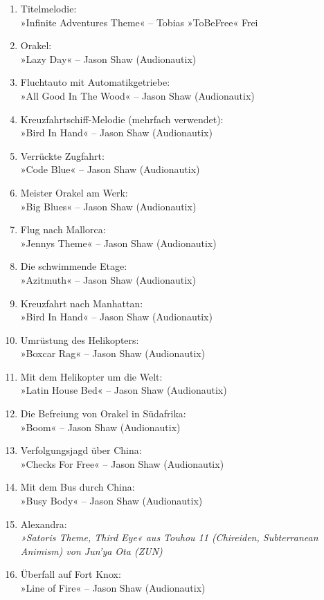 \begin{enumerate}
    \item Titelmelodie:\\ »Infinite Adventures Theme« – Tobias »ToBeFree« Frei
    \item Orakel:\\ »Lazy Day« – Jason Shaw (Audionautix)
    \item Fluchtauto mit Automatikgetriebe:\\ »All Good In The Wood« – Jason Shaw (Audionautix)
    \item Kreuzfahrtschiff-Melodie (mehrfach verwendet):\\ »Bird In Hand« – Jason Shaw (Audionautix)
    \item Verrückte Zugfahrt:\\ »Code Blue« – Jason Shaw (Audionautix)
    \item Meister Orakel am Werk:\\ »Big Blues« – Jason Shaw (Audionautix)
    \item Flug nach Mallorca:\\ »Jennys Theme« – Jason Shaw (Audionautix)
    \item Die schwimmende Etage:\\ »Azitmuth« – Jason Shaw (Audionautix)
    \item Kreuzfahrt nach Manhattan:\\ »Bird In Hand« – Jason Shaw (Audionautix)
    \item Umrüstung des Helikopters:\\ »Boxcar Rag« – Jason Shaw (Audionautix)
    \item Mit dem Helikopter um die Welt:\\ »Latin House Bed« – Jason Shaw (Audionautix)
    \item Die Befreiung von Orakel in Südafrika:\\ »Boom« – Jason Shaw (Audionautix)
    \item Verfolgungsjagd über China:\\ »Checks For Free« – Jason Shaw (Audionautix)
    \item Mit dem Bus durch China:\\ »Busy Body« – Jason Shaw (Audionautix)
    \item Alexandra:\\ \textit{»Satoris Theme, Third Eye« aus Touhou 11 (Chireiden, Subterranean Animism) von Jun'ya Ota (ZUN)}
    \item Überfall auf Fort Knox:\\ »Line of Fire« – Jason Shaw (Audionautix)

\end{enumerate}
